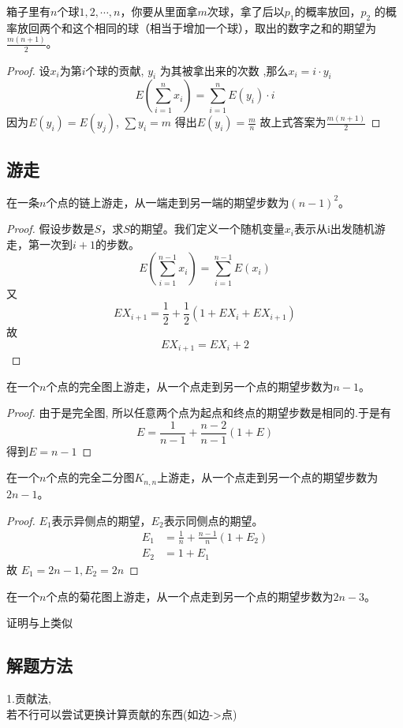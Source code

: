 \begin{proposition}
  箱子里有$n$个球$1,2,⋯,n$，你要从里面拿$m$次球，拿了后以$p_1$的概率放回，$p_2$
  的概率放回两个和这个相同的球（相当于增加一个球），取出的数字之和的期望为 $\frac{m(n+1)}{2}$。
\end{proposition}

\begin{proof}
  设$x_i$为第$i$个球的贡献, $y_i$ 为其被拿出来的次数 ,那么$x_i=i\cdot y_i$
  $$
  E\left(\sum_{i=1}^{n}x_i\right)=\sum_{i=1}^{n}E(y_i)\cdot i
  $$
  因为$E(y_i)=E(y_j)$, $\sum y_i =m$ 得出$E(y_i)=\frac{m}{n}$
  故上式答案为$\frac{m(n+1)}{2}$
\end{proof}

\subsection{游走}
\begin{proposition}
  在一条$n$个点的链上游走，从一端走到另一端的期望步数为$(n-1)^2$。
\end{proposition}

\begin{proof}
  假设步数是$S$，求$S$的期望。我们定义一个随机变量$x_i$表示从i出发随机游走，第一次到$i+1$的步数。
  $$
  E\left(\sum_{i=1}^{n-1}x_i\right)= \sum_{i=1}^{n-1}E(x_i)
  $$
  又
  $$
  EX_{i+1}=\frac{1}{2}+\frac{1}{2}(1+EX_i+EX_{i+1})
  $$
  故
  $$
  EX_{i+1}=EX_{i}+2
  $$
\end{proof}

\begin{proposition}
  在一个$n$个点的完全图上游走，从一个点走到另一个点的期望步数为$n-1$。
\end{proposition}

\begin{proof}
  由于是完全图, 所以任意两个点为起点和终点的期望步数是相同的.于是有
  $$
  E=\frac{1}{n-1}+\frac{n-2}{n-1}(1+E)
  $$
  得到$E=n-1$
\end{proof}

\begin{proposition}
  在一个$n$个点的完全二分图$K_{n,n}$上游走，从一个点走到另一个点的期望步数为$2n-1$。
\end{proposition}

\begin{proof}
  $E_1$表示异侧点的期望，$E_2$表示同侧点的期望。
  $$
  \begin{aligned}
    E_1&=\frac{1}{n}+\frac{n-1}{n}(1+E_2)\\
    E_2&=1+E_1
  \end{aligned}
  $$
  故 $E_1=2n-1 ,E_2=2n$
\end{proof}

\begin{proposition}
  在一个$n$个点的菊花图上游走，从一个点走到另一个点的期望步数为$2n-3$。
\end{proposition}

证明与上类似\\



\subsection{解题方法}
1.贡献法,\\
若不行可以尝试更换计算贡献的东西(如边->点)\\